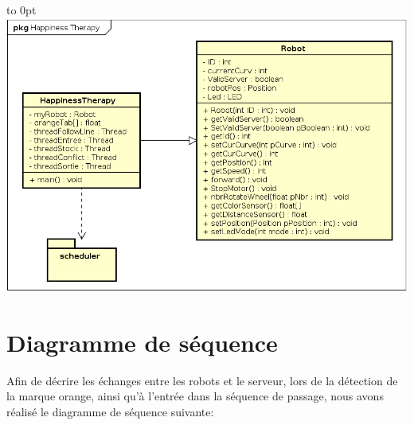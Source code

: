\documentclass[french,a4paper,12pt]{report}
\begin{document}
\hfill\hbox to 0pt{\hss\includegraphics[width=21cm]{HappinessTherapy.png}\hss}\hfill\null\newline

\section{Diagramme de séquence}

Afin de décrire les échanges entre les robots et le serveur, lors de la détection de la marque orange, ainsi qu'à l'entrée dans la séquence de passage, nous avons réalisé le diagramme de séquence suivante:
\end{document}
